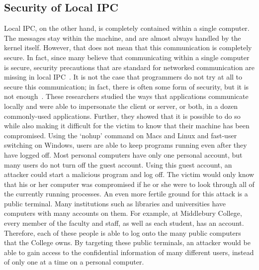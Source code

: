 \subsection{Security of Local IPC}
Local IPC, on the other hand, is completely contained within a single computer.  The messages stay within the machine, and are almost always handled by the kernel itself.  However, that does not mean that this communication is completely secure.  In fact, since many believe that communicating within a single computer is secure, security precautions that are standard for networked communication are missing in local IPC~\cite{MitMa}.  It is not the case that programmers do not try at all to secure this communication; in fact, there is often some form of security, but it is not enough~\cite{MitMa}.  These researchers studied the ways that applications communicate locally and were able to impersonate the client or server, or both, in a dozen commonly-used applications.  Further, they showed that it is possible to do so while also making it difficult for the victim to know that their machine has been compromised.  Using the `nohup' command on Macs and Linux and fast-user switching on Windows, users are able to keep programs running even after they have logged off.  Most personal computers have only one personal account, but many users do not turn off the guest account.  Using this guest account, an attacker could start a malicious program and log off.  The victim would only know that his or her computer was compromised if he or she were to look through all of the currently running processes.  An even more fertile ground for this attack is a public terminal.  Many institutions such as libraries and universities have computers with many accounts on them.  For example, at Middlebury College, every member of the faculty and staff, as well as each student, has an account.  Therefore, each of these people is able to log onto the many public computers that the College owns.  By targeting these public terminals, an attacker would be able to gain access to the confidential information of many different users, instead of only one at a time on a personal computer.


